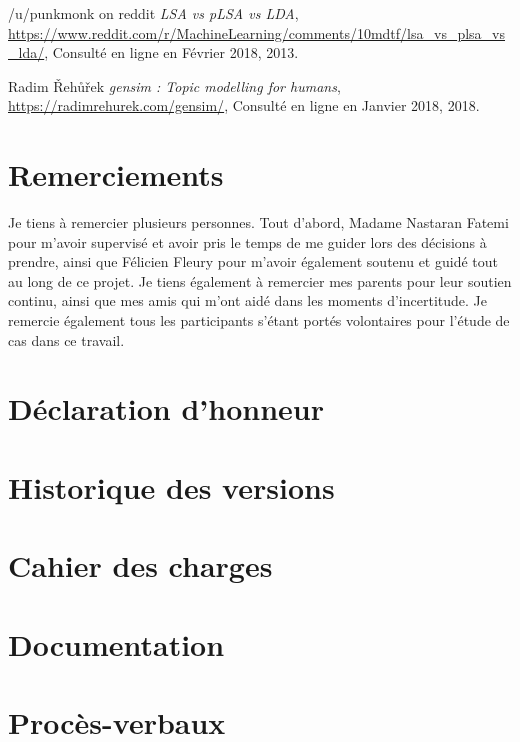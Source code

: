 \begin{thebibliography}{9}
  /u/punkmonk on reddit
  \emph{LSA vs pLSA vs LDA},
  \url{https://www.reddit.com/r/MachineLearning/comments/10mdtf/lsa_vs_plsa_vs_lda/},
  Consulté en ligne en Février 2018,
  2013.

  Radim Řehůřek 
  \emph{gensim : Topic modelling for humans},
  \url{https://radimrehurek.com/gensim/},
  Consulté en ligne en Janvier 2018,
  2018.


\end{thebibliography}

\printglossary

\chapter*{Remerciements}
Je tiens à remercier plusieurs personnes. Tout d'abord, Madame Nastaran Fatemi pour m'avoir supervisé et avoir pris le temps de me guider lors des décisions à prendre, ainsi que Félicien Fleury pour m'avoir également soutenu et guidé tout au long de ce projet. Je tiens également à remercier mes parents pour leur soutien continu, ainsi que mes amis qui m'ont aidé dans les moments d'incertitude. Je remercie également tous les participants s'étant portés volontaires pour l'étude de cas dans ce travail.

\chapter*{Déclaration d'honneur}


\appendix

\chapter{Historique des versions}


\chapter{Cahier des charges}


\chapter{Documentation}


% 

\chapter{Procès-verbaux}




